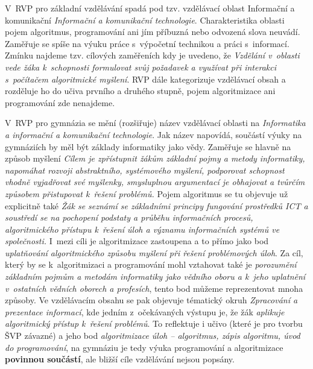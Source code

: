 \documentclass[FP,DP]{tulthesis}
\begin{document}
{V~RVP pro základní vzdělávání \citep{rvpzv} spadá pod tzv. vzdělávací oblast Informační a komunikační \textit{Informační a komunikační technologie}. Charakteristika oblasti pojem algoritmus, programování ani jím příbuzná nebo odvozená slova neuvádí. Zaměřuje se spíše na výuku práce s~výpočetní technikou a práci s~informací. Zmínku najdeme tzv. cílových zaměřeních kdy je uvedeno, že \textit{Vzdělání v~oblasti vede žáka k~schopnosti formulovat svůj požadavek a využívat při interakci s~počítačem algoritmické myšlení}. RVP dále kategorizuje vzdělávací obsah a rozděluje ho do učiva prvního a druhého stupně, pojem algoritmizace ani programování zde nenajdeme. 

V~RVP pro gymnázia se mění (rozšiřuje) název vzdělávací oblasti na \textit {Informatika a informační a komunikační technologie}. Jak název napovídá, součástí výuky na gymnáziích by měl být základy informatiky jako vědy. Zaměřuje se hlavně na způsob myšlení \textit {Cílem je zpřístupnit žákům základní pojmy a metody informatiky, napomáhat rozvoji abstraktního, systémového myšlení, podporovat schopnost vhodně vyjadřovat své myšlenky, smysluplnou argumentací je obhajovat a tvůrčím způsobem přistupovat k~řešení problémů.} Pojem algoritmus se tu objevuje už explicitně také \textit {Žák se seznámí se základními principy fungování prostředků ICT a soustředí se na pochopení podstaty a průběhu informačních procesů, algoritmického přístupu k~řešení úloh a významu informačních systémů ve společnosti.} I~mezi cíli je algoritmizace zastoupena a to přímo jako bod \textit {uplatňování algoritmického způsobu myšlení při řešení problémových úloh}. Za cíl, který by se k~algoritmizaci a programování mohl vztahovat také je \textit {porozumění základním pojmům a metodám informatiky jako vědního oboru a k~jeho uplatnění v~ostatních vědních oborech a profesích}, tento bod můžeme reprezentovat mnoha způsoby. Ve vzdělávacím obsahu se pak objevuje tématický okruh \textit {Zpracování  a prezentace informací}, kde jedním z~očekávaných výstupu je, že žák \textit {aplikuje algoritmický přístup k~řešení problémů}. To reflektuje i učivo (které je pro tvorbu ŠVP závazné) a jeho bod \textit {algoritmizace úloh – algoritmus, zápis algoritmu, úvod do programování}, na gymnáziu je tedy výuka programování a algoritmizace \textbf{povinnou součástí}, ale bližší cíle vzdělávání nejsou popsány.

}
\end{document}
